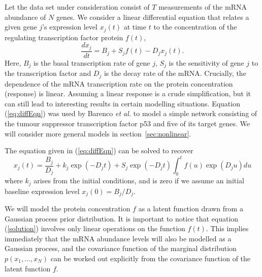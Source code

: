 \documentclass[english]{article}
\begin{document}
Let the data set under consideration consist of $T$ measurements of the mRNA 
abundance of $N$ genes. We consider a linear differential
equation that relates a given gene $j$'s expression level $x_{j}(t)$
at time $t$ to the concentration
of the regulating transcription factor protein $f(t)$,\begin{equation}
\frac{dx_{j}}{dt}=B_{j}+S_{j}f\left(t\right)-D_{j}x_{j}\left(t\right)
. \label{eq:diffEqn}\end{equation}
Here, $B_{j}$ is the basal transcription rate of gene $j$, $S_{j}$ is the sensitivity of gene $j$ to the transcription
factor and $D_{j}$ is the decay rate of the mRNA. Crucially, the dependence of
the mRNA transcription rate on the protein concentration (response) is linear. 
Assuming a linear response is a 
crude simplification, but it can still lead to interesting results 
in certain modelling 
situations. Equation (\ref{eq:diffEqn}) was used by Barenco \emph{et al.}
\cite{Barenco:ranked06}
to model a simple network consisting of the tumour suppressor transcription
factor p53 and five of its target genes. 
We will consider more general models in section~\ref{sec:nonlinear}.

The equation given in (\ref{eq:diffEqn}) can be solved to recover\begin{equation}
x_{j}\left(t\right)=\frac{B_{j}}{D_{j}}+k_{j}\exp\left(-D_{j}t\right)+S_{j}
\exp\left(-D_{j}t\right)\int_{0}^{t}f\left(u\right)\exp\left(D_{j}u\right)du
\label{solution}\end{equation}
where $k_{j}$ arises from the initial conditions, 
and is zero if we assume an initial baseline expression level
$x_j(0)=B_{j}/D_{j}$.

We will model the protein concentration $f$ as a latent function drawn from 
a Gaussian process prior distribution. 
It is important to notice that equation (\ref{solution}) involves only linear
operations on the function $f\left(t\right)$. This implies immediately that the
mRNA abundance levels will also be modelled as a Gaussian process, and the 
covariance function of the marginal distribution $p\left(x_1,\ldots,x_N\right)$
can be worked out explicitly from the covariance function of the latent
function $f$.
\end{document}

